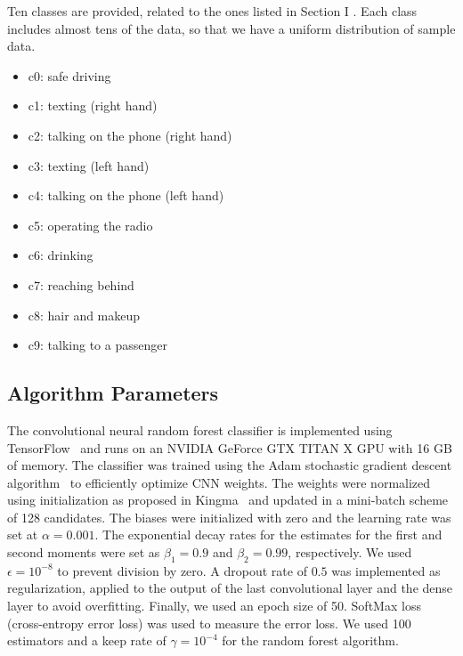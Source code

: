 Ten classes are provided, related to the ones listed in Section I \@. Each class includes almost tens of the data, so that we have a uniform distribution of sample data.

\begin{multicols}{2}
\centering
\begin{itemize}
\item c0: safe driving
\item c1: texting (right hand)
\item c2: talking on the phone (right hand)
\item c3: texting (left hand)
\item c4: talking on the phone (left hand)
\item c5: operating the radio
\item c6: drinking
\item c7: reaching behind
\item c8: hair and makeup
\item c9: talking to a passenger
\end{itemize}
\end{multicols}


\subsection{Algorithm Parameters}The convolutional neural random forest classifier is implemented using TensorFlow~\cite{abadi_TensorFlow_2016} and runs on an NVIDIA GeForce GTX TITAN X GPU with 16 GB of memory. The classifier was trained using the Adam stochastic gradient descent algorithm~\cite{kingma_Adam_2014} to efficiently optimize CNN weights. The weights were normalized using initialization as proposed in Kingma~\cite{kingma_Adam_2014} and updated in a mini-batch scheme of 128 candidates. The biases were initialized with zero and the learning rate was set at $\alpha = 0.001 $. The exponential decay rates for the estimates for the first and second moments were set as $\beta_1 = 0.9 $ and $\beta_2 = 0.99 $, respectively. We used $\epsilon = {10}^{-8} $ to prevent division by zero. A dropout rate of $0.5 $ was implemented as regularization, applied to the output of the last convolutional layer and the dense layer to avoid overfitting. Finally, we used an epoch size of 50.  SoftMax loss (cross-entropy error loss) was used to measure the error loss. We used 100 estimators and a keep rate of $\gamma = {10}^{-4} $ for the random forest algorithm.


